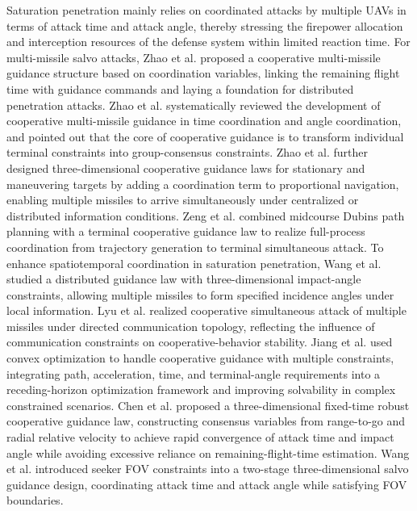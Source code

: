 \documentclass[unbranded]{cja}
\begin{document}
Saturation penetration mainly relies on coordinated attacks by multiple UAVs in terms of attack time and attack angle, thereby stressing the firepower allocation and interception resources of the defense system within limited reaction time. For multi-missile salvo attacks, Zhao et al.\cite{ZhaoZhou2008AAS} proposed a cooperative multi-missile guidance structure based on coordination variables, linking the remaining flight time with guidance commands and laying a foundation for distributed penetration attacks. Zhao et al.\cite{ZhaoYang2017AAS} systematically reviewed the development of cooperative multi-missile guidance in time coordination and angle coordination, and pointed out that the core of cooperative guidance is to transform individual terminal constraints into group-consensus constraints. Zhao et al.\cite{Zhao2015CJA} further designed three-dimensional cooperative guidance laws for stationary and maneuvering targets by adding a coordination term to proportional navigation, enabling multiple missiles to arrive simultaneously under centralized or distributed information conditions. Zeng et al.\cite{Zeng2018CJA} combined midcourse Dubins path planning with a terminal cooperative guidance law to realize full-process coordination from trajectory generation to terminal simultaneous attack. To enhance spatiotemporal coordination in saturation penetration, Wang et al.\cite{WangLu2018ISA} studied a distributed guidance law with three-dimensional impact-angle constraints, allowing multiple missiles to form specified incidence angles under local information. Lyu et al.\cite{Lyu2019AST} realized cooperative simultaneous attack of multiple missiles under directed communication topology, reflecting the influence of communication constraints on cooperative-behavior stability. Jiang et al.\cite{Jiang2018AST} used convex optimization to handle cooperative guidance with multiple constraints, integrating path, acceleration, time, and terminal-angle requirements into a receding-horizon optimization framework and improving solvability in complex constrained scenarios. Chen et al.\cite{Chen2021AST} proposed a three-dimensional fixed-time robust cooperative guidance law, constructing consensus variables from range-to-go and radial relative velocity to achieve rapid convergence of attack time and impact angle while avoiding excessive reliance on remaining-flight-time estimation. Wang et al.\cite{Ai2019FOVSalvo} introduced seeker FOV constraints into a two-stage three-dimensional salvo guidance design, coordinating attack time and attack angle while satisfying FOV boundaries.
\end{document}
